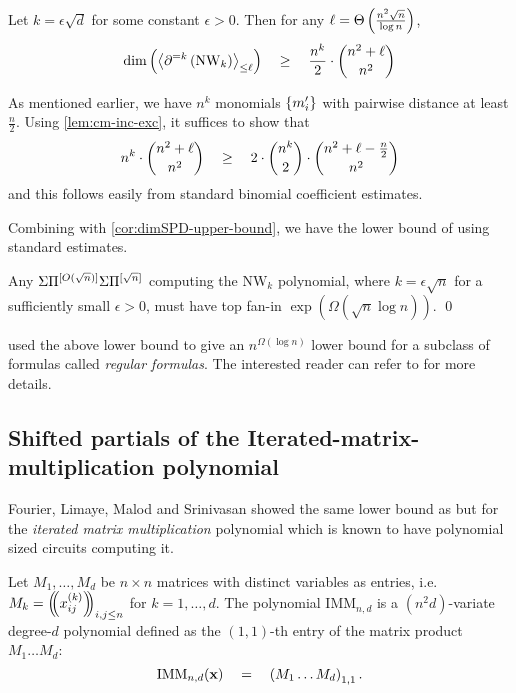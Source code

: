 \begin{theorem}
Let $k = \epsilon \sqrt{d}$ for some constant $\epsilon > 0$. 
Then for any  $\ell = \Theta\left(\frac{n^2 \sqrt{n}}{\log n}\right)$,
$$
\dim\left(\left\langle\partial^{=k}\left(\mathrm{NW}_k\right)\right\rangle_{\leq \ell}\right) \quad \geq \quad \frac{n^k}{2} \cdot \binom{n^2 + \ell}{n^2}
$$
\end{theorem}
\begin{proof-sketch}
As mentioned earlier, we have $n^k$ monomials $\left\{m_i'\right\}$ with pairwise distance at least $\frac{n}{2}$. 
Using \autoref{lem:cm-inc-exc}, it suffices to show that
$$
n^k \cdot \binom{n^2 + \ell}{n^2} \quad \geq \quad 2 \cdot \binom{n^k}{2} \cdot \binom{n^2 + \ell - \frac{n}{2}}{n^2}
$$
and this follows easily from standard binomial coefficient estimates. 
\end{proof-sketch}

Combining with \autoref{cor:dimSPD-upper-bound}, we have the lower bound of \cite{KSS13} using standard estimates. 

\begin{theorem}
Any $\Sigma\Pi^{[O(\sqrt{n})]}\Sigma\Pi^{[\sqrt{n}]}$ computing the $\mathrm{NW}_k$ polynomial, where $k = \epsilon \sqrt{n}$ for a sufficiently small $\epsilon > 0$, must have top fan-in $\exp(\Omega(\sqrt{n}\log n))$. \qed
\end{theorem}

\cite{KSS13} used the above lower bound to give an $n^{\Omega(\log n)}$ lower bound for a subclass of formulas called \emph{regular formulas}. 
The interested reader can refer to \cite{KSS13} for more details. 

\subsection{Shifted partials of the Iterated-matrix-multiplication polynomial}

Fourier, Limaye, Malod and Srinivasan \cite{FLMS13} showed the same lower bound as \cite{KSS13} but for the \emph{iterated matrix multiplication} polynomial which is known to have polynomial sized circuits computing it. 

\begin{definition}
Let $M_1,\dots, M_d$ be $n\times n$ matrices with distinct variables as entries, i.e. $M_k = \left(\!\!\left(x_{ij}^{(k)}\right)\!\!\right)_{i,j\leq n}$ for $k = 1,\dots, d$. 
The polynomial $\mathrm{IMM}_{n,d}$ is a $(n^2d)$-variate degree-$d$ polynomial defined as the $(1,1)$-th entry of the matrix product $M_1\dots M_d$:
$$
\mathrm{IMM}_{n,d}(\mathbf{x}) \quad = \quad \left(M_1 \dots M_d\right)_{1,1}.
$$
\end{definition}

